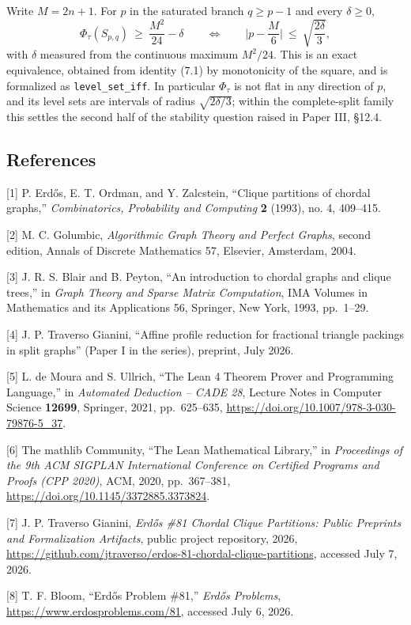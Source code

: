\documentclass[english,11pt,a4paper]{article}
\begin{document}
Write \(M=2n+1\). For \(p\) in the saturated branch \(q\ge p-1\) and
every \(\delta\ge0\), \[
\Phi_\tau(S_{p,q})\ \ge\ \frac{M^2}{24}-\delta\qquad\Longleftrightarrow\qquad \Big|p-\frac{M}{6}\Big|\ \le\ \sqrt{\frac{2\delta}{3}},
\] with \(\delta\) measured from the continuous maximum \(M^2/24\). This
is an exact equivalence, obtained from identity (7.1) by monotonicity of
the square, and is formalized as \nolinkurl{level_set_iff}. In particular
\(\Phi_\tau\) is not flat in any direction of \(p\), and its level sets
are intervals of radius \(\sqrt{2\delta/3}\); within the complete-split
family this settles the second half of the stability question raised in
Paper III, §12.4.

\subsection{References}\label{references}

{[}1{]} P. Erdős, E. T. Ordman, and Y. Zalcstein, ``Clique partitions of
chordal graphs,'' \emph{Combinatorics, Probability and Computing}
\textbf{2} (1993), no. 4, 409--415.

{[}2{]} M. C. Golumbic, \emph{Algorithmic Graph Theory and Perfect
Graphs}, second edition, Annals of Discrete Mathematics 57, Elsevier,
Amsterdam, 2004.

{[}3{]} J. R. S. Blair and B. Peyton, ``An introduction to chordal
graphs and clique trees,'' in \emph{Graph Theory and Sparse Matrix
Computation}, IMA Volumes in Mathematics and its Applications 56,
Springer, New York, 1993, pp.~1--29.

{[}4{]} J. P. Traverso Gianini, ``Affine profile reduction for
fractional triangle packings in split graphs'' (Paper I in the series),
preprint, July 2026.

{[}5{]} L. de Moura and S. Ullrich, ``The Lean 4 Theorem Prover and
Programming Language,'' in \emph{Automated Deduction -- CADE 28},
Lecture Notes in Computer Science \textbf{12699}, Springer, 2021,
pp.~625--635, \url{https://doi.org/10.1007/978-3-030-79876-5_37}.

{[}6{]} The mathlib Community, ``The Lean Mathematical Library,'' in
\emph{Proceedings of the 9th ACM SIGPLAN International Conference on
Certified Programs and Proofs (CPP 2020)}, ACM, 2020, pp.~367--381,
\url{https://doi.org/10.1145/3372885.3373824}.

{[}7{]} J. P. Traverso Gianini, \emph{Erdős \#81 Chordal Clique
Partitions: Public Preprints and Formalization Artifacts}, public
project repository, 2026,
\url{https://github.com/jtraverso/erdos-81-chordal-clique-partitions},
accessed July 7, 2026.

{[}8{]} T. F. Bloom, ``Erdős Problem \#81,'' \emph{Erdős Problems},
\url{https://www.erdosproblems.com/81}, accessed July 6, 2026.
\end{document}
